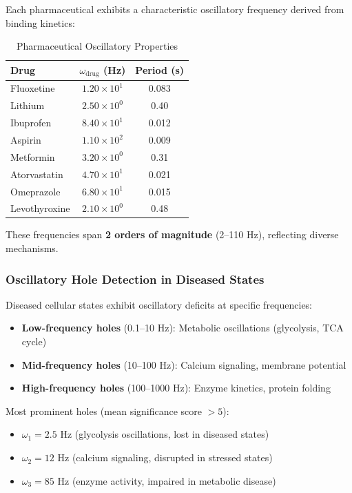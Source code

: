 \documentclass{article}
\begin{document}
Each pharmaceutical exhibits a characteristic oscillatory frequency derived from binding kinetics:

\begin{table}[h]
\centering
\caption{Pharmaceutical Oscillatory Properties}
\begin{tabular}{lcc}
\toprule
\textbf{Drug} & \textbf{$\omega_{\text{drug}}$ (Hz)} & \textbf{Period (s)} \\
\midrule
Fluoxetine & $1.20 \times 10^1$ & 0.083 \\
Lithium & $2.50 \times 10^0$ & 0.40 \\
Ibuprofen & $8.40 \times 10^1$ & 0.012 \\
Aspirin & $1.10 \times 10^2$ & 0.009 \\
Metformin & $3.20 \times 10^0$ & 0.31 \\
Atorvastatin & $4.70 \times 10^1$ & 0.021 \\
Omeprazole & $6.80 \times 10^1$ & 0.015 \\
Levothyroxine & $2.10 \times 10^0$ & 0.48 \\
\bottomrule
\end{tabular}
\end{table}

These frequencies span \textbf{2 orders of magnitude} (2--110 Hz), reflecting diverse mechanisms.

\subsubsection{Oscillatory Hole Detection in Diseased States}

Diseased cellular states exhibit oscillatory deficits at specific frequencies:

\begin{itemize}
    \item \textbf{Low-frequency holes} (0.1--10 Hz): Metabolic oscillations (glycolysis, TCA cycle)
    \item \textbf{Mid-frequency holes} (10--100 Hz): Calcium signaling, membrane potential
    \item \textbf{High-frequency holes} (100--1000 Hz): Enzyme kinetics, protein folding
\end{itemize}

Most prominent holes (mean significance score $> 5$):

\begin{itemize}
    \item $\omega_1 = 2.5$ Hz (glycolysis oscillations, lost in diseased states)
    \item $\omega_2 = 12$ Hz (calcium signaling, disrupted in stressed states)
    \item $\omega_3 = 85$ Hz (enzyme activity, impaired in metabolic disease)
\end{itemize}
\end{document}
